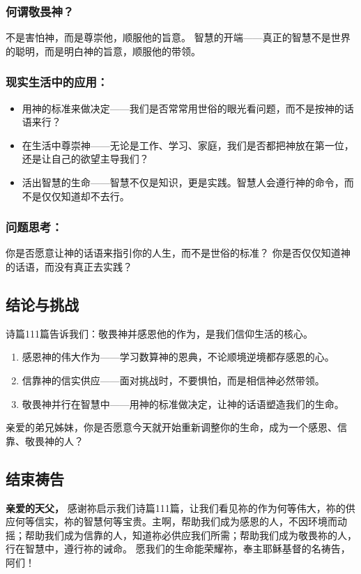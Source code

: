 \documentclass[a4paper, 12pt]{article}
\begin{document}
\subsubsection*{何谓敬畏神？}

不是害怕神，而是尊崇他，顺服他的旨意。
智慧的开端——真正的智慧不是世界的聪明，而是明白神的旨意，顺服他的带领。
\subsubsection*{现实生活中的应用：}
\begin{itemize}
    \item 用神的标准来做决定——我们是否常常用世俗的眼光看问题，而不是按神的话语来行？

    \item 在生活中尊崇神——无论是工作、学习、家庭，我们是否都把神放在第一位，还是让自己的欲望主导我们？

    \item 活出智慧的生命——智慧不仅是知识，更是实践。智慧人会遵行神的命令，而不是仅仅知道却不去行。

\end{itemize}
\subsubsection*{问题思考：}

你是否愿意让神的话语来指引你的人生，而不是世俗的标准？
你是否仅仅知道神的话语，而没有真正去实践？
\subsection*{结论与挑战}
诗篇111篇告诉我们：敬畏神并感恩他的作为，是我们信仰生活的核心。
\begin{enumerate}
    \item 感恩神的伟大作为——学习数算神的恩典，不论顺境逆境都存感恩的心。

    \item 信靠神的信实供应——面对挑战时，不要惧怕，而是相信神必然带领。

    \item 敬畏神并行在智慧中——用神的标准做决定，让神的话语塑造我们的生命。

\end{enumerate}

亲爱的弟兄姊妹，你是否愿意今天就开始重新调整你的生命，成为一个感恩、信靠、敬畏神的人？

\subsection*{结束祷告}
\textbf{亲爱的天父，}
感谢祢启示我们诗篇111篇，让我们看见祢的作为何等伟大，祢的供应何等信实，祢的智慧何等宝贵。主啊，帮助我们成为感恩的人，不因环境而动摇；帮助我们成为信靠的人，知道祢必供应我们所需；帮助我们成为敬畏祢的人，行在智慧中，遵行祢的诫命。
愿我们的生命能荣耀祢，奉主耶稣基督的名祷告，阿们！
\newpage
\end{document}
